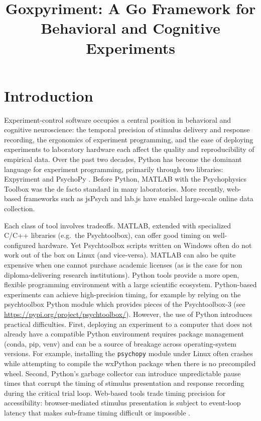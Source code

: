 \documentclass[jou,a4paper]{apa7}
\title{Goxpyriment: A Go Framework for Behavioral and Cognitive Experiments}
\begin{document}
\maketitle

\section{Introduction}\label{introduction}

Experiment-control software occupies a central position in behavioral
and cognitive neuroscience: the temporal precision of stimulus
delivery and response recording, the ergonomics of experiment
programming, and the ease of deploying experiments to laboratory
hardware each affect the quality and reproducibility of empirical
data. Over the past two decades, Python has become the dominant
language for experiment programming, primarily through two libraries:
Expyriment \parencite{krause2014} and
PsychoPy \parencite{peirce2019}. Before Python, MATLAB with the
Psychophysics Toolbox \parencite{brainard1997, kleiner2007} was the de
facto standard in many laboratories. More recently, web-based
frameworks such as jsPsych \parencite{deleeuw2015, deleeuw2023} and
lab.js \parencite{henninger2022} have enabled large-scale online data
collection.

Each class of tool involves tradeoffs. MATLAB, extended with
specialized C/C++ libraries (e.g.\ the Psychtoolbox), can offer good
timing on well-configured hardware. Yet Psychtoolbox scripts written
on Windows often do not work out of the box on Linux (and
vice-versa). MATLAB can also be quite expensive when one cannot purchase
academic licenses (as is the case for non diploma-delivering research institutions).
Python tools provide a more open, flexible
programming environment with a large scientific ecosystem.
Python-based experiments can achieve high-precision timing, for
example by relying on the psychtoolbox Python module which provides
pieces of the Psychtoolbox-3 (see
\url{https://pypi.org/project/psychtoolbox/}). However, the use of
Python introduces practical difficulties. First, deploying an
experiment to a computer that does not already have a compatible
Python environment requires package management (conda, pip, venv) and
can be a source of breakage across operating-system versions. For
example, installing the \texttt{psychopy} module under Linux often
crashes while attempting to compile the wxPython package when there is
no precompiled wheel. Second, Python's garbage collector can introduce
unpredictable pause times that corrupt the timing of stimulus
presentation and response recording during the critical trial
loop. Web-based tools trade timing precision for accessibility:
browser-mediated stimulus presentation is subject to event-loop
latency that makes sub-frame timing difficult or impossible
\parencite{bridges2020, anwylirvine2021}.
\end{document}
